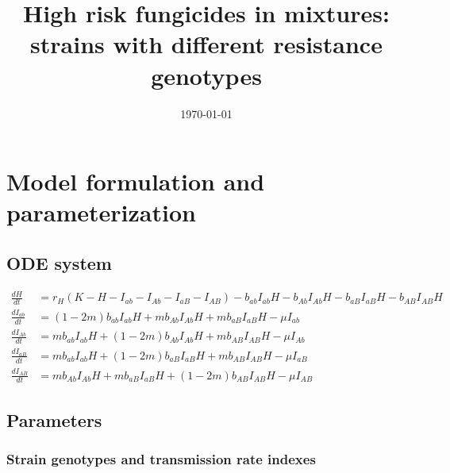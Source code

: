 \documentclass{report}
\begin{document}
\title{High risk fungicides in mixtures:\\
\large strains with different resistance genotypes}
\date{\today}
\maketitle

\tableofcontents
\newpage

\chapter{Model formulation and parameterization}
\section{ODE system}
\begin{align}
    \frac{dH}{dt} &= r_H ( K - H - I_{ab} - I_{Ab} - I_{aB} - I_{AB})-b_{ab} I_{ab} H - b_{Ab} I_{Ab} H - b_{aB} I_{aB} H - b_{AB} I_{AB} H \label{eq:1}\\
    \frac{dI_{ab}}{dt} &= (1 - 2m)b_{ab} I_{ab} H   + mb_{Ab} I_{Ab} H + mb_{aB} I_{aB} H- \mu I_{ab} \label{eq:2}\\
    \frac{dI_{Ab}}{dt} &= mb_{ab} I_{ab} H   + (1-2m)b_{Ab} I_{Ab} H + mb_{AB} I_{AB} H - \mu I_{Ab} \label{eq:3}\\
    \frac{dI_{aB}}{dt} &= mb_{ab} I_{ab} H   + (1-2m)b_{aB} I_{aB} H + mb_{AB} I_{AB} H - \mu I_{aB} \label{eq:4}\\
    \frac{dI_{AB}}{dt} &= mb_{Ab} I_{Ab} H  + mb_{aB} I_{aB} H + (1-2m)b_{AB} I_{AB} H - \mu I_{AB} \label{eq:5}  
\end{align} 

\section{Parameters}
\subsection{Strain genotypes and transmission rate indexes}
\end{document}
